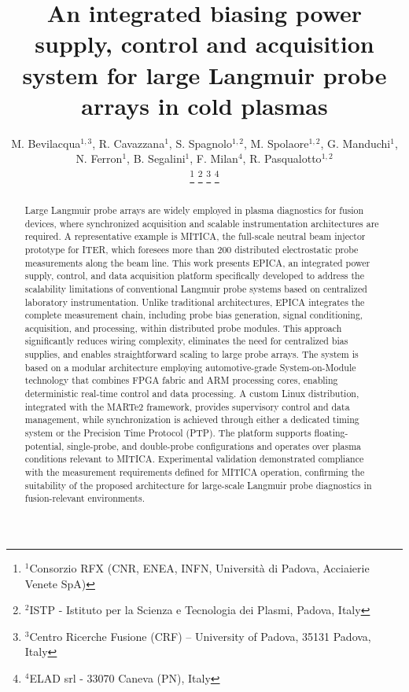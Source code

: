 \documentclass{IEEEtran}
\begin{document}
	
	\title{An integrated biasing power supply, control and acquisition system for large Langmuir probe arrays in cold plasmas}
	\author{M. Bevilacqua$^{1,3}$, R. Cavazzana$^{1}$, S. Spagnolo$^{1,2}$, M. Spolaore$^{1,2}$, G. Manduchi$^{1}$, N. Ferron$^{1}$, B. Segalini$^{1}$, F. Milan$^{4}$, R. Pasqualotto$^{1,2}$
		
		\thanks{$^1$Consorzio RFX (CNR, ENEA, INFN, Università di Padova, Acciaierie Venete SpA)}
		\thanks{$^2$ISTP - Istituto per la Scienza e Tecnologia dei Plasmi, Padova, Italy}
		\thanks{$^3$Centro Ricerche Fusione (CRF) – University of Padova, 35131 Padova, Italy}
		\thanks{$^4$ELAD srl - 33070 Caneva (PN), Italy}
	}
	\maketitle
	
	\begin{abstract}
		Large Langmuir probe arrays are widely employed in plasma diagnostics for fusion devices, where synchronized acquisition and scalable instrumentation architectures are required. A representative example is MITICA, the full-scale neutral beam injector prototype for ITER, which foresees more than 200 distributed electrostatic probe measurements along the beam line. This work presents EPICA, an integrated power supply, control, and data acquisition platform specifically developed to address the scalability limitations of conventional Langmuir probe systems based on centralized laboratory instrumentation. Unlike traditional architectures, EPICA integrates the complete measurement chain, including probe bias generation, signal conditioning, acquisition, and processing, within distributed probe modules. This approach significantly reduces wiring complexity, eliminates the need for centralized bias supplies, and enables straightforward scaling to large probe arrays. The system is based on a modular architecture employing automotive-grade System-on-Module technology that combines FPGA fabric and ARM processing cores, enabling deterministic real-time control and data processing. A custom Linux distribution, integrated with the MARTe2 framework, provides supervisory control and data management, while synchronization is achieved through either a dedicated timing system or the Precision Time Protocol (PTP). The platform supports floating-potential, single-probe, and double-probe configurations and operates over plasma conditions relevant to MITICA. Experimental validation demonstrated compliance with the measurement requirements defined for MITICA operation, confirming the suitability of the proposed architecture for large-scale Langmuir probe diagnostics in fusion-relevant environments.
		
	\end{abstract}
	
\end{document}
